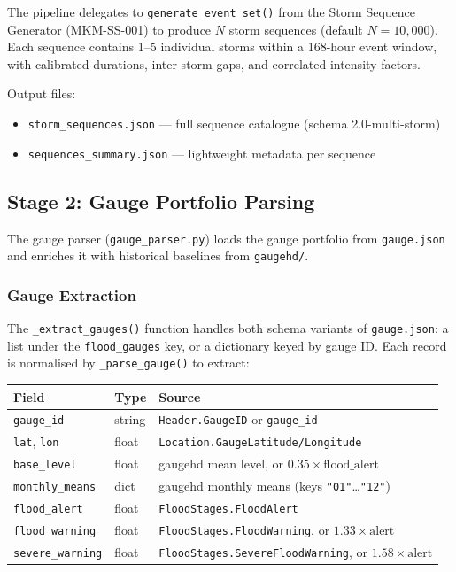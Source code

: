 \documentclass[11pt,a4paper]{article}
\begin{document}
The pipeline delegates to \texttt{generate\_event\_set()} from the Storm
Sequence Generator (MKM-SS-001) to produce $N$ storm sequences (default
$N = 10{,}000$). Each sequence contains 1--5 individual storms within a
168-hour event window, with calibrated durations, inter-storm gaps, and
correlated intensity factors.

Output files:
\begin{itemize}[nosep]
    \item \texttt{storm\_sequences.json} --- full sequence catalogue (schema 2.0-multi-storm)
    \item \texttt{sequences\_summary.json} --- lightweight metadata per sequence
\end{itemize}

\subsection{Stage 2: Gauge Portfolio Parsing}
\label{sec:gauge_parsing}

The gauge parser (\texttt{gauge\_parser.py}) loads the gauge portfolio from
\texttt{gauge.json} and enriches it with historical baselines from
\texttt{gaugehd/}.

\subsubsection{Gauge Extraction}
The \texttt{\_extract\_gauges()} function handles both schema variants of
\texttt{gauge.json}: a list under the \texttt{flood\_gauges} key, or a
dictionary keyed by gauge ID. Each record is normalised by
\texttt{\_parse\_gauge()} to extract:

\begin{center}
\begin{tabular}{llp{7cm}}
\toprule
\textbf{Field} & \textbf{Type} & \textbf{Source} \\
\midrule
\texttt{gauge\_id} & string & \texttt{Header.GaugeID} or \texttt{gauge\_id} \\
\texttt{lat}, \texttt{lon} & float & \texttt{Location.GaugeLatitude/Longitude} \\
\texttt{base\_level} & float & gaugehd mean level, or $0.35 \times \text{flood\_alert}$ \\
\texttt{monthly\_means} & dict & gaugehd monthly means (keys \texttt{"01"}\ldots\texttt{"12"}) \\
\texttt{flood\_alert} & float & \texttt{FloodStages.FloodAlert} \\
\texttt{flood\_warning} & float & \texttt{FloodStages.FloodWarning}, or $1.33 \times \text{alert}$ \\
\texttt{severe\_warning} & float & \texttt{FloodStages.SevereFloodWarning}, or $1.58 \times \text{alert}$ \\
\bottomrule
\end{tabular}
\end{center}
\end{document}
